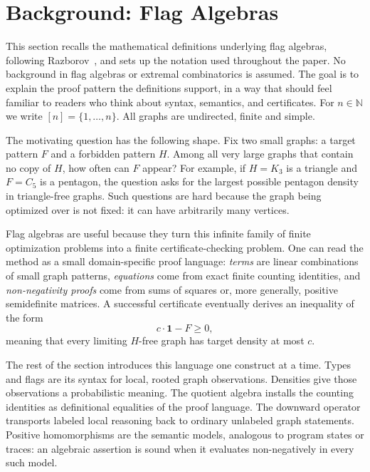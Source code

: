 \documentclass{article}
\begin{document}
\section{Background: Flag Algebras}
\label{sec:background}

This section recalls the mathematical definitions underlying flag algebras,
following Razborov~\cite{razborov2007flag}, and sets up the notation used
throughout the paper.  No background in flag algebras or extremal
combinatorics is assumed.  The goal is to explain the proof pattern the
definitions support, in a way that should feel familiar to readers who think
about syntax, semantics, and certificates.
For $n \in \mathbb{N}$ we write $[n] = \{1,\ldots,n\}$.
All graphs are undirected, finite and simple.

The motivating question has the following shape.  Fix two small graphs:
a target pattern $F$ and a forbidden pattern $H$.  Among all very large graphs
that contain no copy of $H$, how often can $F$ appear?  For example, if
$H=K_3$ is a triangle and $F=C_5$ is a pentagon, the question asks for the
largest possible pentagon density in triangle-free graphs.  Such questions are
hard because the graph being optimized over is not fixed: it can have
arbitrarily many vertices.

Flag algebras are useful because they turn this infinite family of finite
optimization problems into a finite certificate-checking problem.  One can
read the method as a small domain-specific proof language:
\emph{terms} are linear combinations of small graph patterns,
\emph{equations} come from exact finite counting identities, and
\emph{non-negativity proofs} come from sums of squares or, more generally,
positive semidefinite matrices.  A successful certificate eventually derives
an inequality of the form
\[
  c\cdot\mathbf{1}-F \geq 0,
\]
meaning that every limiting $H$-free graph has target density at most $c$.

The rest of the section introduces this language one construct at a time.
Types and flags are its syntax for local, rooted graph observations.  Densities
give those observations a probabilistic meaning.  The quotient algebra installs
the counting identities as definitional equalities of the proof language.  The
downward operator transports labeled local reasoning back to ordinary unlabeled
graph statements.  Positive homomorphisms are the semantic models, analogous to
program states or traces: an algebraic assertion is sound when it evaluates
non-negatively in every such model.
\end{document}
